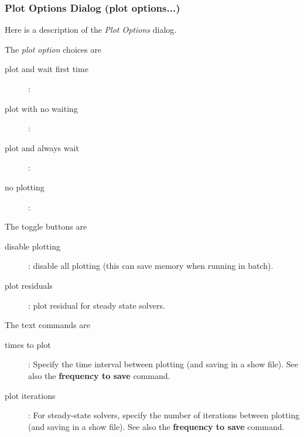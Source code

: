 \subsubsection{Plot Options Dialog (plot options...)}\label{sec:plotOptions}

Here is a description of the {\em Plot Options} dialog.

\noindent The {\em plot option} choices are
\begin{description}
  \item[\qquad plot and wait first time] : 
  \item[\qquad plot with no waiting] : 
  \item[\qquad plot and always wait] : 
  \item[\qquad no plotting] : 
\end{description}

\noindent The toggle buttons are 
\begin{description}
  \item[\qquad disable plotting] : disable all plotting (this can save memory when running in batch).
  \item[\qquad plot residuals] : plot residual for steady state solvers.
\end{description}

\noindent The text commands are 
\begin{description}
  \item[\qquad times to plot] : Specify the time interval between plotting (and saving in a show file). See also
         the {\bf frequency to save} command. 
  \item[\qquad plot iterations] : For steady-state solvers, specify the number of iterations between plotting (and saving in a show file). See also the {\bf frequency to save} command. 
\end{description}

